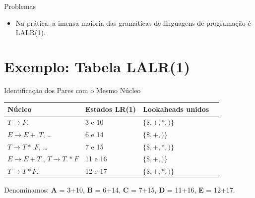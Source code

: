 \begin{frame}{Problemas}

    \begin{itemize}

        \item
        Na prática: a imensa maioria das gramáticas de linguagens de
        programação é LALR(1).
    \end{itemize}
\end{frame}


\section{Exemplo: Tabela LALR(1)}\label{exemplo-tabela-lalr1}

\begin{frame}{Identificação dos Pares com o Mesmo Núcleo}

    \begin{table}
        \begin{tabular}{l l l l}
            \hline
            Núcleo & Estados LR(1) & Lookaheads unidos \\
            \hline
            \(T \to F .\) & 3 e 10 & \(\{\$, +, *, )\}\) \\
            \(E \to E + . T\), \ldots{} & 6 e 14 & \(\{\$, +, )\}\) \\
            \(T \to T * . F\), \ldots{} & 7 e 15 & \(\{\$, +, *, )\}\) \\
            \(E \to E + T .\), \(T \to T . * F\) & 11 e 16 & \(\{\$, +, )\}\) \\
            \(T \to T * F .\) & 12 e 17 & \(\{\$, +, *, )\}\) \\
            \hline
        \end{tabular}
    \end{table}

    Denominamos: \textbf{A} = 3+10, \textbf{B} = 6+14, \textbf{C} = 7+15,
    \textbf{D} = 11+16, \textbf{E} = 12+17.
\end{frame}

